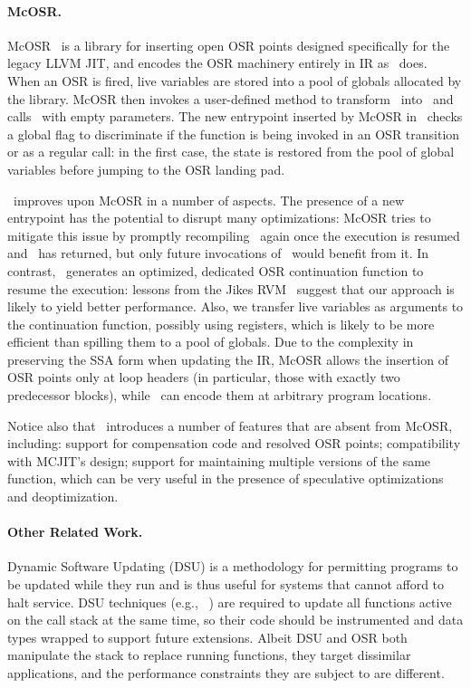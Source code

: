 \paragraph*{McOSR.} McOSR~\cite{Lameed13} is a library for inserting open OSR points designed specifically for the legacy LLVM JIT, and encodes the OSR machinery entirely in IR as \osrkit\ does. When an OSR is fired, live variables are stored into a pool of globals allocated by the library. McOSR then invokes a user-defined method to transform \fbase\ into \fvariant\ and calls \fbase\ with empty parameters. The new entrypoint inserted by McOSR in \fbase\ checks a global flag to discriminate if the function is being invoked in an OSR transition or as a regular call: in the first case, the state is restored from the pool of global variables before jumping to the OSR landing pad.

\osrkit\ improves upon McOSR in a number of aspects. The presence of a new entrypoint has the potential to disrupt many optimizations: McOSR tries to mitigate this issue by promptly recompiling \fbase\ again once the execution is resumed and \fbase\ has returned, but only future invocations of \fbase\ would benefit from it. In contrast, \osrkit\ generates an optimized, dedicated OSR continuation function to resume the execution: lessons from the Jikes RVM~\cite{Fink03} suggest that our approach is likely to yield better performance. Also, we transfer live variables as arguments to the continuation function, possibly using registers, which is likely to be more efficient than spilling them to a pool of globals.
Due to the complexity in preserving the SSA form when updating the IR, McOSR allows the insertion of OSR points only at loop headers (in particular, those with exactly two predecessor blocks), while \osrkit\ can encode them at arbitrary program locations.

Notice also that \osrkit\ introduces a number of features that are absent from McOSR, including: support for compensation code and resolved OSR points; compatibility with MCJIT's design; support for maintaining multiple versions of the same function, which can be very useful in the presence of speculative optimizations and deoptimization.

\paragraph*{Other Related Work.}
Dynamic Software Updating (DSU) is a methodology for permitting programs to be updated while they run and is thus useful for systems that cannot afford to halt service. DSU techniques (e.g., ~\cite{Neamtiu06,Makris09}) are required to update all functions active on the call stack at the same time, so their code should be instrumented and data types wrapped to support future extensions. Albeit DSU and OSR both manipulate the stack to replace running functions, they target dissimilar applications, and the performance constraints they are subject to are different. 

